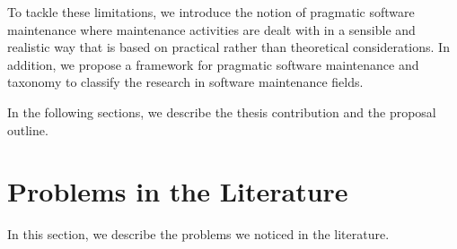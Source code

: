 To tackle these limitations, we introduce the notion of pragmatic software maintenance where maintenance activities are dealt with in a sensible and realistic way that is based on practical rather than theoretical considerations.
In addition, we propose a framework for pragmatic software maintenance and taxonomy to classify the research in software maintenance fields.

In the following sections, we describe the thesis contribution and the proposal outline.

\section{Problems in the Literature\label{sec:pb-litterature}}

In this section, we describe the problems we noticed in the literature.

